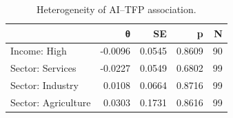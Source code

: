 \begin{table}[t]
\centering\small
\begin{tabular}{lrrrr}
\toprule
 & θ & SE & p & N \\
\midrule
Income: High & -0.0096 & 0.0545 & 0.8609 & 90 \\
Sector: Services & -0.0227 & 0.0549 & 0.6802 & 99 \\
Sector: Industry & 0.0108 & 0.0664 & 0.8716 & 99 \\
Sector: Agriculture & 0.0303 & 0.1731 & 0.8616 & 99 \\
\bottomrule
\end{tabular}
\caption{Heterogeneity of AI--TFP association.}
\label{tab:het}
\end{table}